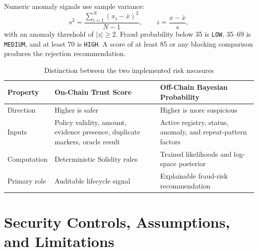 Numeric anomaly signals use sample variance:
\begin{equation}
s^2=\frac{\sum_{i=1}^{N}(x_i-\bar{x})^2}{N-1},
\qquad
z=\frac{x-\bar{x}}{s},
\label{eq:zscore}
\end{equation}
with an anomaly threshold of \(|z|\geq2\). Fraud probability below 35 is
\texttt{LOW}, 35--69 is \texttt{MEDIUM}, and at least 70 is \texttt{HIGH}.
A score of at least 85 or any blocking comparison produces the rejection
recommendation.

\begin{table}[htbp]
\centering
\caption{Distinction between the two implemented risk measures}
\label{tab:risk_measure_comparison}
\begin{tabular}{|p{3.4cm}|p{5.4cm}|p{5.4cm}|}
\hline
\textbf{Property} & \textbf{On-Chain Trust Score} &
\textbf{Off-Chain Bayesian Probability} \\
\hline
Direction & Higher is safer & Higher is more suspicious \\
\hline
Inputs & Policy validity, amount, evidence presence, duplicate markers, oracle
result & Active registry, status, anomaly, and repeat-pattern factors \\
\hline
Computation & Deterministic Solidity rules & Trained likelihoods and log-space
posterior \\
\hline
Primary role & Auditable lifecycle signal & Explainable fraud-risk
recommendation \\
\hline
\end{tabular}
\end{table}

\section{Security Controls, Assumptions, and Limitations}
\label{sec:method_security_limitations}


